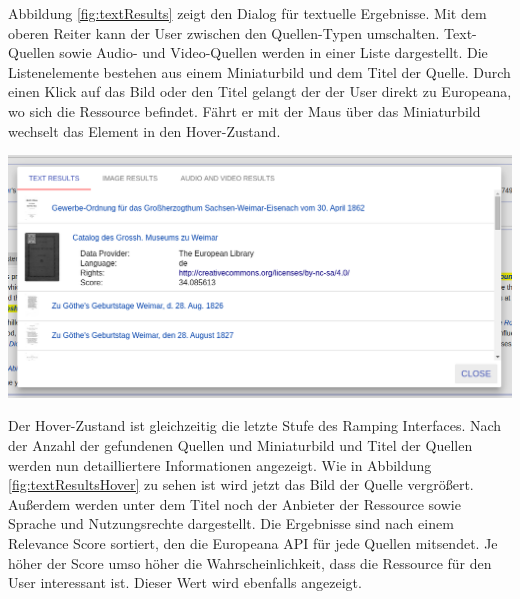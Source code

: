  Abbildung \ref{fig:textResults} zeigt den Dialog für textuelle Ergebnisse. Mit dem oberen Reiter kann der User zwischen den Quellen-Typen umschalten. Text-Quellen sowie Audio- und Video-Quellen werden in einer Liste dargestellt. Die Listenelemente bestehen aus einem Miniaturbild und dem Titel der Quelle. Durch einen Klick auf das Bild oder den Titel gelangt der der User direkt zu Europeana, wo sich die Ressource befindet. Fährt er mit der Maus über das Miniaturbild wechselt das Element in den Hover-Zustand. 

 \begin{minipage}{\linewidth}
	\centering
	\vspace*{0.5cm}
	\includegraphics[width=\linewidth]{Bilder/app-screenshots/text-results-hovered.png}
	\label{fig:textResultsHover}
	\vspace*{0.5cm}
 \end{minipage}

 Der Hover-Zustand ist gleichzeitig die letzte Stufe des Ramping Interfaces. Nach der Anzahl der gefundenen Quellen und Miniaturbild und Titel der Quellen werden nun detailliertere Informationen angezeigt. Wie in Abbildung \ref{fig:textResultsHover} zu sehen ist wird jetzt das Bild der Quelle vergrößert. Außerdem werden unter dem Titel noch der Anbieter der Ressource sowie Sprache und Nutzungsrechte dargestellt. Die Ergebnisse sind nach einem Relevance Score sortiert, den die Europeana API für jede Quellen mitsendet. Je höher der Score umso höher die Wahrscheinlichkeit, dass die Ressource für den User interessant ist. Dieser Wert wird ebenfalls angezeigt. 

